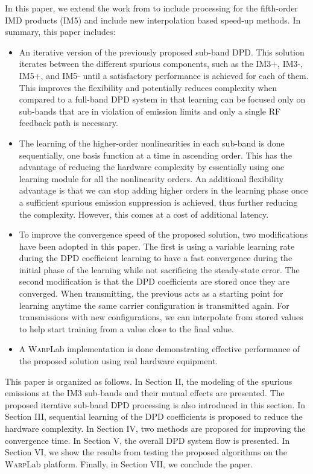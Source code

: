 In this paper, we extend the work from \cite{Tarver16} to include processing for the fifth-order IMD products (IM5) and include new interpolation based speed-up methods. In summary, this paper includes:
\begin{itemize}
	\item An iterative version of the previously proposed sub-band DPD. This solution iterates between the different spurious components, such as the IM3+, IM3-, IM5+, and IM5- until a satisfactory performance is achieved for each of them. This improves the flexibility and potentially reduces complexity when compared to a full-band DPD system in that learning can be focused only on sub-bands that are in violation of emission limits and only a single RF feedback path is necessary. 
	\item The learning of the higher-order nonlinearities in each sub-band is done sequentially, one basis function at a time in ascending order. 
	This has the advantage of reducing the hardware complexity by essentially using one learning module for all the nonlinearity orders. 
	An additional flexibility advantage is that we can stop adding higher orders in the learning phase once a sufficient spurious emission suppression is achieved, thus further reducing the complexity. However, this comes at a cost of additional latency. 
	\item To improve the convergence speed of the proposed solution, two modifications have been adopted in this paper. 
	The first is using a variable learning rate during the DPD coefficient learning to have a fast convergence during the initial phase of the learning while not sacrificing the steady-state error. 
	The second modification is that the DPD coefficients are stored once they are converged. When transmitting, the previous acts as a starting point for learning anytime the same carrier configuration is transmitted again. For transmissions with new configurations, we can interpolate from stored values to help start training from a value close to the final value. 
	\item A \textsc{Warp}Lab implementation is done demonstrating effective performance of the proposed solution using real hardware equipment. 
\end{itemize}

This paper is organized as follows. 
In Section II, the modeling of the spurious emissions at the IM3 sub-bands and their mutual effects are presented.
The proposed iterative sub-band DPD processing is also introduced in this section. 
In Section III, sequential learning of the DPD coefficients is proposed to reduce the hardware complexity. 
In Section IV, two methods are proposed for improving the convergence time. 
In Section V, the overall DPD system flow is presented. 
In Section VI, we show the results from testing the proposed algorithms on the \textsc{Warp}Lab platform. 
Finally, in Section VII, we conclude the paper.

